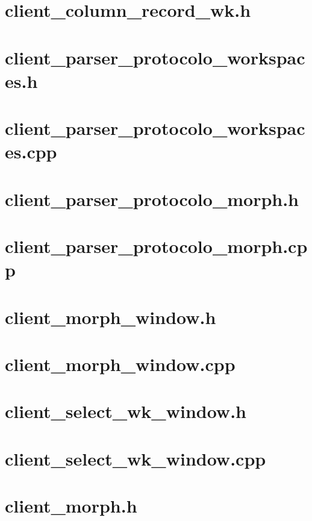 \documentclass{article}
\begin{document}
\section{ client\_column\_record\_wk.h }

\newpage
\section{ client\_parser\_protocolo\_workspaces.h }

\newpage
\section{ client\_parser\_protocolo\_workspaces.cpp }

\newpage
\section{ client\_parser\_protocolo\_morph.h }

\newpage
\section{ client\_parser\_protocolo\_morph.cpp }

\newpage
\section{ client\_morph\_window.h }

\newpage
\section{ client\_morph\_window.cpp }

\newpage
\section{ client\_select\_wk\_window.h }

\newpage
\section{ client\_select\_wk\_window.cpp }

\newpage
\section{ client\_morph.h }

\newpage
\end{document}
